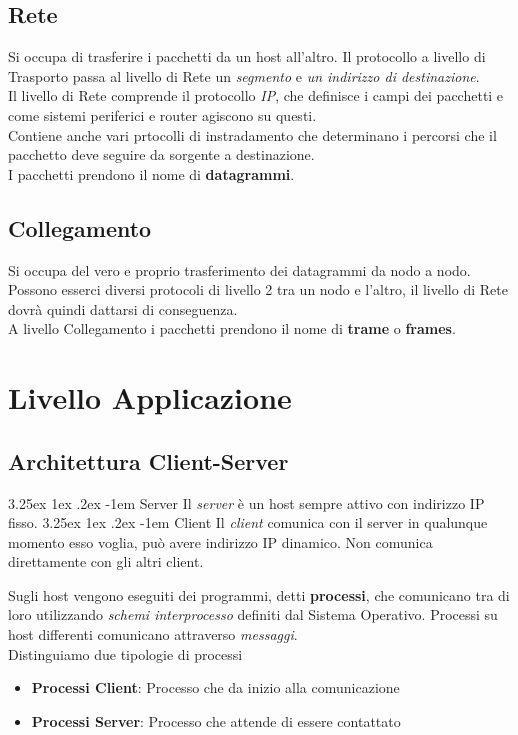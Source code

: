 \documentclass{article}
\makeatletter
\renewcommand\paragraph{\@startsection{paragraph}{5}{\z@}%
  {3.25ex \@plus1ex \@minus.2ex}%
  {-1em}%
  {\normalfont\normalsize\bfseries}}
\makeatother
\begin{document}
        \subsection{Rete}
            Si occupa di trasferire i pacchetti da un host all'altro. Il protocollo a livello di Trasporto passa al livello di Rete un \textit{segmento} e \textit{un indirizzo di destinazione}.\\
            Il livello di Rete comprende il protocollo \textit{IP}, che definisce i campi dei pacchetti e come sistemi periferici e router agiscono su questi.\\
            Contiene anche vari prtocolli di instradamento che determinano i percorsi che il pacchetto deve seguire da sorgente a destinazione.\\
            I pacchetti prendono il nome di \textbf{datagrammi}.

        \subsection{Collegamento}
            Si occupa del vero e proprio trasferimento dei datagrammi da nodo a nodo. Possono esserci diversi protocoli di livello 2 tra un nodo e l'altro, il livello di Rete dovrà quindi dattarsi di conseguenza.\\
            A livello Collegamento i pacchetti prendono il nome di \textbf{trame} o \textbf{frames}. 
        
    \section{Livello Applicazione}
        \subsection{Architettura Client-Server}
            \paragraph{Server} Il \textit{server} è un host sempre attivo con indirizzo IP fisso.
            \paragraph{Client} Il \textit{client} comunica con il server in qualunque momento esso voglia, può avere indirizzo IP dinamico. Non comunica direttamente con gli altri client.

            Sugli host vengono eseguiti dei programmi, detti \textbf{processi}, che comunicano tra di loro utilizzando \textit{schemi interprocesso} definiti dal Sistema Operativo. Processi su host differenti comunicano attraverso \textit{messaggi}.\\
            Distinguiamo due tipologie di processi
            \begin{itemize}
                \item \textbf{Processi Client}: Processo che da inizio alla comunicazione
                \item \textbf{Processi Server}: Processo che attende di essere contattato
            \end{itemize}
\end{document}
